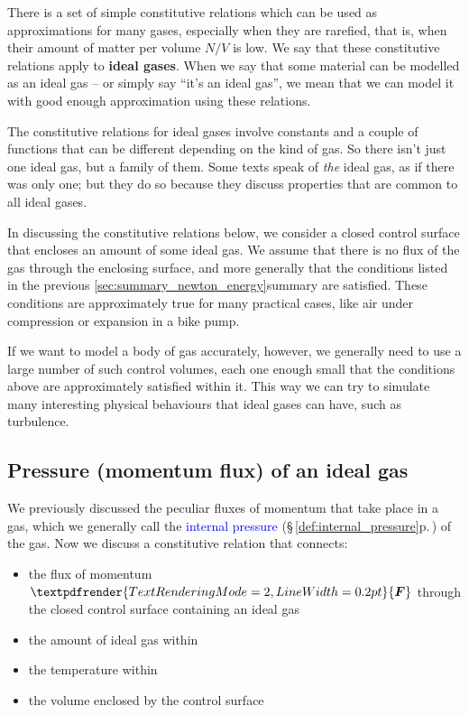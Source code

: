\documentclass[a4paper,12pt,%
onecolumn,oneside,%
british%
]{memoir}
\renewcommand*{\bm}[1]{\textpdfrender{TextRenderingMode=2,LineWidth=0.2pt}{\boldsymbol{#1}}}
\renewcommand*{\|}[1][]{\nonscript\:#1\vert\nonscript\:\mathopen{}}
\newcommand*{\sect}{\S}%
\renewcommand*{\autoref}[3][\sect\,\ref]{\textcolor{blue}{#3} {\color{blue}\scriptsize(\faIcon[regular]{eye}\;#1{#2}\;p.\,\pageref{#2})}}
\newcommand*{\yN}{N}
\newcommand*{\yF}{\bm{F}}
\begin{document}
There is a set of simple constitutive relations which can be used as approximations for many gases, especially when they are rarefied, that is, when their amount of matter per volume $\yN/V$ is low. We say that these constitutive relations apply to \textbf{ideal gases}. When we say that some material can be modelled as an ideal gas -- or simply say \enquote{it's an ideal gas}, we mean that we can model it with good enough approximation using these relations.

The constitutive relations for ideal gases involve constants and a couple of functions that can be different depending on the kind of gas. So there isn't just one ideal gas, but a family of them. Some texts speak of \emph{the} ideal gas, as if there was only one; but they do so because they discuss properties that are common to all ideal gases.

\medskip

In discussing the constitutive relations below, we consider a closed control surface that encloses an amount of some ideal gas. We assume that there is no flux of the gas through the enclosing surface, and more generally that the conditions listed in the previous \ref{sec:summary_newton_energy}{summary} are satisfied. These conditions are approximately true for many practical cases, like air under compression or expansion in a bike pump.

If we want to model a body of gas accurately, however, we generally need to use a large number of such control volumes, each one enough small that the conditions above are approximately satisfied within it. This way we can try to simulate many interesting physical behaviours that ideal gases can have, such as turbulence.


\subsection{Pressure (momentum flux) of an ideal gas}
\label{sec:pressure_ideal_gas}

We previously discussed the peculiar fluxes of momentum that take place in a gas, which we generally call the \autoref{def:internal_pressure}{internal pressure} of the gas. Now we discuss a constitutive relation that connects:
\begin{itemize}[nosep]
\item the flux of momentum $\yF$ through the closed control surface containing an ideal gas
\item the amount of ideal gas within
\item the temperature within
\item the volume enclosed by the control surface
\end{itemize}
\end{document}

